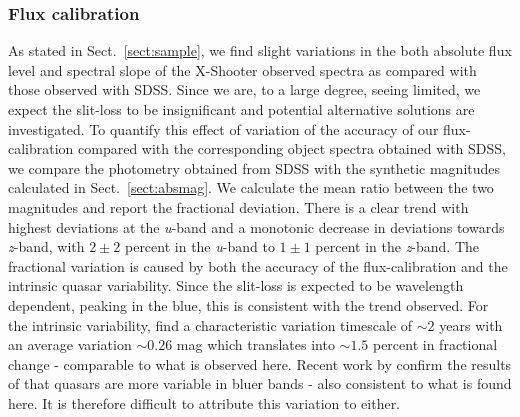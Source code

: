 \documentclass{aa}    %
\newcommand{\sectionname}{Sect.}
\newcommand{\Sect}[1]{\sectionname~\ref{sect:#1}}
\newcommand{\sect}[1]{\Sect{#1}}
\newcommand{\sectlabel}[1]{\label{sect:#1}}
\begin{document}
{%
\subsubsection{Flux calibration}  \sectlabel{Flux calibration}
As stated in \sect{sample}, we find slight variations in the both absolute flux level and spectral slope of the X-Shooter observed spectra as compared with those observed with SDSS. Since we are, to a large degree, seeing limited, we expect the slit-loss to be insignificant and potential alternative solutions are investigated. To quantify this effect of variation of the accuracy of our flux-calibration compared with the corresponding object spectra obtained with SDSS, we compare the photometry obtained from SDSS with the synthetic magnitudes calculated in \sect{absmag}. We calculate the mean ratio between the two magnitudes and report the fractional deviation. There is a clear trend with highest deviations at the \textit{u}-band and a monotonic decrease in deviations towards \textit{z}-band, with $2 \pm 2$ percent in the \textit{u}-band to $1 \pm 1$ percent in the \textit{z}-band. The fractional variation is caused by both the accuracy of the flux-calibration and the intrinsic quasar variability. Since the slit-loss is expected to be wavelength dependent, peaking in the blue, this is consistent with the trend observed. For the intrinsic variability, \cite{MacLeod2012} find a characteristic variation timescale of $\sim 2$ years with an average variation $\sim 0.26$ mag which translates into $\sim 1.5$ percent in fractional change - comparable to what is observed here. Recent work by \cite{Morganson2014} confirm the results of \cite{Helfand2001} that quasars are more variable in bluer bands - also consistent to what is found here. It is therefore difficult to attribute this variation to either. 


}
\end{document}
